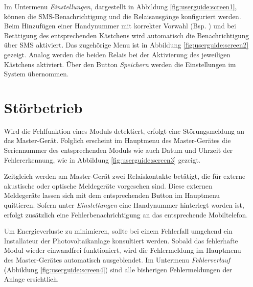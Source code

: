 Im     Untermenu     \emph{Einstellungen},    dargestellt     in     Abbildung
\ref{fig:userguide:screen1},   k\"onnen  die   SMS-Benachrichtigung  und   die
Relaisausg\"ange konfiguriert werden. Beim  Hinzuf\"ugen einer Handynummer mit
korrekter Vorwahl  (Bsp. ) und bei  Bet\"atigung des
entsprechenden K\"astchens  wird automatisch  die Benachrichtigung  \"uber SMS
aktiviert. Das zugeh\"orige Menu  ist in Abbildung \ref{fig:userguide:screen2}
gezeigt.  Analog werden  die beiden Relais bei der  Aktivierung des jeweiligen
K\"astchens  aktiviert.    \"Uber  den  Button  \emph{Speichern}   werden  die
Einstellungen im System \"ubernommen.


\section{St\"orbetrieb}
\label{sec:userguide:errors}

Wird die Fehlfunktion eines  Moduls detektiert, erfolgt eine St\"orungsmeldung
an das  Master-Ger\"at. Folglich erscheint  im Hauptmenu  des Master-Ger\"ates
die  Seriennummer des  entsprechenden Moduls  wie auch  Datum und  Uhrzeit der
Fehlererkennung, wie in Abbildung \ref{fig:userguide:screen3} gezeigt.

Zeitgleich  werden  am  Master-Ger\"at  zwei  Relaiskontakte  bet\"atigt,  die
f\"ur externe  akustische oder  optische Meldeger\"ate  vorgesehen sind. Diese
externen Meldeger\"ate lassen sich mit  dem entsprechenden Button im Hauptmenu
quittieren. Sofern  unter  \emph{Einstellungen}  eine  Handynummer  hinterlegt
worden   ist,  erfolgt   zus\"atzlich  eine   Fehlerbenachrichtigung  an   das
entsprechende Mobiltelefon.

Um Energieverluste  zu minimieren,  sollte bei  einem Fehlerfall  umgehend ein
Installateur der Photovoltaikanlage konsultiert werden. Sobald das fehlerhafte
Modul wieder einwandfrei funktioniert, wird die Fehlermeldung im Hauptmenu des
Master-Ger\"ates  automatisch ausgeblendet. Im  Untermenu \emph{Fehlerverlauf}
(Abbildung \ref{fig:userguide:screen4})  sind alle  bisherigen Fehlermeldungen
der Anlage ersichtlich.

